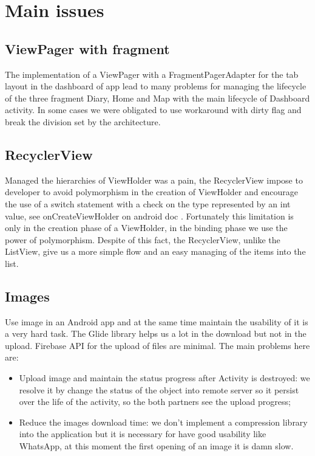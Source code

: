 
\section{Main issues}
\label{sec:issues} 

\subsection{ViewPager with fragment}
The implementation of a ViewPager with a FragmentPagerAdapter for the tab layout in the dashboard of app lead to many problems for managing the lifecycle of the three fragment Diary, Home and Map with the main lifecycle of Dashboard activity.
In some cases we were obligated to use workaround with dirty flag \cite{DirtyFlagh} and break the division set by the architecture.

\subsection{RecyclerView}
Managed the hierarchies of ViewHolder was a pain, the RecyclerView impose to developer to avoid polymorphism in the creation of ViewHolder and encourage the use of a switch statement with a check on the type represented by an int value, see onCreateViewHolder on android doc \cite{RecyclerView_Adapter}. Fortunately this limitation is only in the creation phase of a ViewHolder, in the binding phase we use the power of polymorphism. Despite of this fact, the RecyclerView, unlike the ListView, give us a more simple flow and an easy managing of the items into the list.

\subsection{Images}
Use image in an Android app and at the same time maintain the usability of it is a very hard task. The Glide library helps us a lot in the download but not in the upload. Firebase API for the upload of files are minimal. The main problems here are:
\begin{itemize}
	\item Upload image and maintain the status progress after Activity is destroyed: we resolve it by change the status of the object into remote server so it persist over the life of the activity, so the both partners see the upload progress;
	\item Reduce the images download time: we don't implement a compression library into the application but it is necessary for have good usability like WhatsApp, at this moment the first opening of an image it is damn slow.
\end{itemize}

